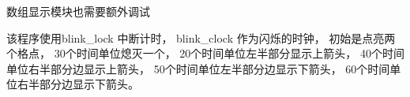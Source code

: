 \documentclass[../main.tex]{subfiles} %
\begin{document}
数组显示模块也需要额外调试



该程序使用blink\_lock 中断计时，
blink\_clock 作为闪烁的时钟，
初始是点亮两个格点，
30个时间单位熄灭一个，
20个时间单位左半部分显示上箭头，
40个时间单位右半部分边显示上箭头，
50个时间单位左半部分边显示下箭头，
60个时间单位右半部分边显示下箭头。
\end{document}
